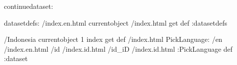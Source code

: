 \begin{ingrid}
continuedataset:

datasetdefs:
/index.en.html currentobject /index.html get def
:datasetdefs

/Indonesia currentobject 1 index get def
/index.html {
PickLanguage:
/en /index.en.html
/id /index.id.html
/id_iD /index.id.html
:PickLanguage
} def
:dataset
\end{ingrid}
